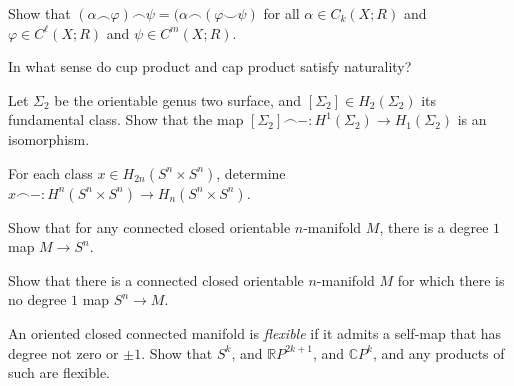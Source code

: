\documentclass[12pt]{pset}
\author{Jim Fowler}
\date{Spring 2012}
\newcommand{\CP}{\mathbb{C}P}
\newcommand{\RP}{\mathbb{R}P}
\begin{document}
\maketitle


\begin{problem}
  Show that $(\alpha \smallfrown \varphi) \smallfrown \psi = (\alpha
  \smallfrown (\varphi \smallsmile \psi)$ for all $\alpha \in
  C_k(X;R)$ and $\varphi \in C^\ell(X;R)$ and $\psi \in C^m(X;R)$.
\end{problem}

\begin{problem}[Natural]
In what sense do cup product and cap product satisfy naturality?
\end{problem}

\begin{problem}
  Let $\Sigma_2$ be the orientable genus two surface, and $[\Sigma_2]
  \in H_2(\Sigma_2)$ its fundamental class.  Show that the map
  $[\Sigma_2] \smallfrown - : H^1(\Sigma_2) \to H_1(\Sigma_2)$ is an
  isomorphism.
\end{problem}

\begin{problem}
  For each class $x \in H_{2n}(S^n \times S^n)$, determine $x \smallfrown
  - : H^n(S^n \times S^n) \to H_n(S^n \times S^n)$.
\end{problem}

\begin{problem}
  Show that for any connected closed orientable $n$-manifold $M$,
  there is a degree $1$ map $M \to S^n$.
\end{problem}

\begin{problem}
  Show that there is a connected closed orientable $n$-manifold $M$
  for which there is no degree $1$ map $S^n \to M$.
\end{problem}

\begin{hardproblem}
  An oriented closed connected manifold is \textit{flexible} if it
  admits a self-map that has degree not zero or $\pm 1$.  Show that
  $S^k$, and $\RP^{2k+1}$, and $\CP^k$, and any products of such are
  flexible.
\end{hardproblem}

\end{document}
